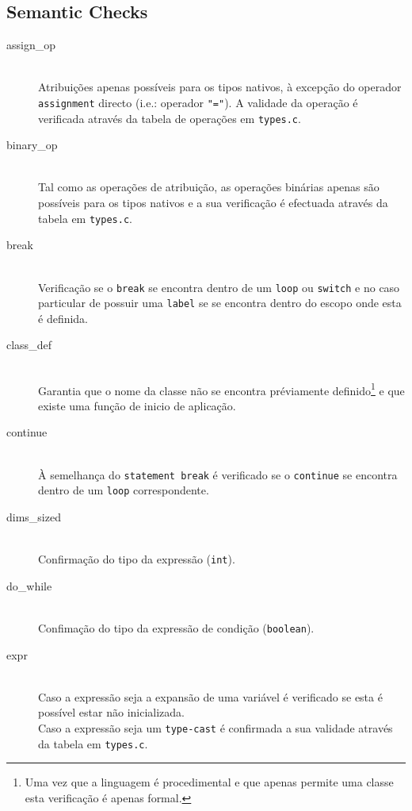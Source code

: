 \documentclass[a4paper]{article}
\begin{document}
\cleardoublepage
\subsection{Semantic Checks}
\begin{description}
	\item [assign\_op] \hfill \\
		Atribuições apenas possíveis para os tipos nativos, à excepção do operador \texttt{assignment} directo (i.e.: operador \texttt{"="}).
		A validade da operação é verificada através da tabela de operações em \texttt{types.c}.

	\item [binary\_op] \hfill \\
		Tal como as operações de atribuição, as operações binárias apenas são possíveis para os tipos nativos e a sua verificação
		é efectuada através da tabela em \texttt{types.c}.

	\item [break] \hfill \\
		Verificação se o \texttt{break} se encontra dentro de um \texttt{loop} ou \texttt{switch}
		e no caso particular de possuir uma \texttt{label} se se encontra dentro do escopo onde esta é definida.

	\item [class\_def] \hfill \\
		Garantia que o nome da classe não se encontra préviamente definido\footnote[1]{Uma vez que a linguagem é procedimental e que apenas permite uma classe esta verificação é apenas formal.} e que existe uma função
		de inicio de aplicação.

	\item [continue] \hfill \\
		À semelhança do \texttt{statement break} é verificado se o \texttt{continue} se encontra dentro de um \texttt{loop} correspondente.

	\item [dims\_sized] \hfill \\
		Confirmação do tipo da expressão (\texttt{int}).

	\item [do\_while] \hfill \\
		Confimação do tipo da expressão de condição (\texttt{boolean}).

	\item [expr] \hfill \\
		Caso a expressão seja a expansão de uma variável é verificado se esta é possível estar não inicializada. \\
		Caso a expressão seja um \texttt{type-cast} é confirmada a sua validade através da tabela em \texttt{types.c}.


\end{description}
\end{document}
